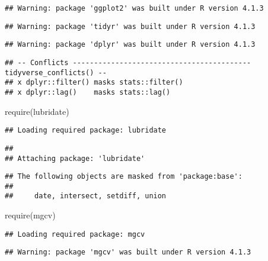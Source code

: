 \documentclass[]{elsarticle} %
\newenvironment{Shaded}{\begin{snugshade}}{\end{snugshade}}
\newcommand{\FunctionTok}[1]{\textcolor[rgb]{0.00,0.00,0.00}{#1}}
\newcommand{\NormalTok}[1]{#1}
\begin{document}
\begin{verbatim}
## Warning: package 'ggplot2' was built under R version 4.1.3
\end{verbatim}

\begin{verbatim}
## Warning: package 'tidyr' was built under R version 4.1.3
\end{verbatim}

\begin{verbatim}
## Warning: package 'dplyr' was built under R version 4.1.3
\end{verbatim}

\begin{verbatim}
## -- Conflicts ------------------------------------------ tidyverse_conflicts() --
## x dplyr::filter() masks stats::filter()
## x dplyr::lag()    masks stats::lag()
\end{verbatim}

\begin{Shaded}
\begin{Highlighting}[]
\FunctionTok{require}\NormalTok{(lubridate)}
\end{Highlighting}
\end{Shaded}

\begin{verbatim}
## Loading required package: lubridate
\end{verbatim}

\begin{verbatim}
## 
## Attaching package: 'lubridate'
\end{verbatim}

\begin{verbatim}
## The following objects are masked from 'package:base':
## 
##     date, intersect, setdiff, union
\end{verbatim}

\begin{Shaded}
\begin{Highlighting}[]
\FunctionTok{require}\NormalTok{(mgcv)}
\end{Highlighting}
\end{Shaded}

\begin{verbatim}
## Loading required package: mgcv
\end{verbatim}

\begin{verbatim}
## Warning: package 'mgcv' was built under R version 4.1.3
\end{verbatim}
\end{document}
